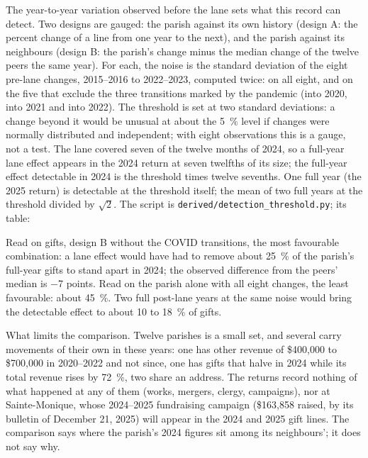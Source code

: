\documentclass[11pt,letterpaper]{article}
\begin{document}
The year-to-year variation observed before the lane sets what this record can detect. Two designs are gauged: the parish against its own history (design A: the percent change of a line from one year to the next), and the parish against its neighbours (design B: the parish's change minus the median change of the twelve peers the same year). For each, the noise is the standard deviation of the eight pre-lane changes, 2015--2016 to 2022--2023, computed twice: on all eight, and on the five that exclude the three transitions marked by the pandemic (into 2020, into 2021 and into 2022). The threshold is set at two standard deviations: a change beyond it would be unusual at about the 5~\% level if changes were normally distributed and independent; with eight observations this is a gauge, not a test. The lane covered seven of the twelve months of 2024, so a full-year lane effect appears in the 2024 return at seven twelfths of its size; the full-year effect detectable in 2024 is the threshold times twelve sevenths. One full year (the 2025 return) is detectable at the threshold itself; the mean of two full years at the threshold divided by $\sqrt{2}$. The script is \texttt{derived/detection\_threshold.py}; its table:

\begin{center}\resizebox{\textwidth}{!}{}\end{center}

Read on gifts, design B without the COVID transitions, the most favourable combination: a lane effect would have had to remove about 25~\% of the parish's full-year gifts to stand apart in 2024; the observed difference from the peers' median is $-$7 points. Read on the parish alone with all eight changes, the least favourable: about 45~\%. Two full post-lane years at the same noise would bring the detectable effect to about 10 to 18~\% of gifts.

What limits the comparison. Twelve parishes is a small set, and several carry movements of their own in these years: one has other revenue of \$400,000 to \$700,000 in 2020--2022 and not since, one has gifts that halve in 2024 while its total revenue rises by 72~\%, two share an address. The returns record nothing of what happened at any of them (works, mergers, clergy, campaigns), nor at Sainte-Monique, whose 2024--2025 fundraising campaign (\$163,858 raised, by its bulletin of December 21, 2025) will appear in the 2024 and 2025 gift lines. The comparison says where the parish's 2024 figures sit among its neighbours'; it does not say why.
\end{document}
